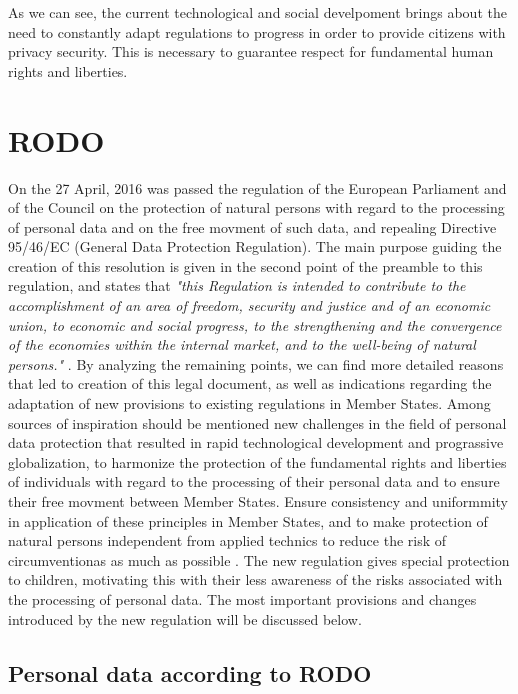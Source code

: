 \documentclass[en, noamssymb]{mgr}
\begin{document}
\indent As we can see, the current technological and social develpoment brings about the need to constantly adapt regulations to progress in order to provide citizens with privacy security. This is necessary to guarantee respect for fundamental human rights and liberties.

\chapter{RODO} \label{sec:sekcjaRODO}

On the 27 April, 2016 was passed the regulation of the European Parliament and of the Council on the protection of natural persons with regard to the processing of personal data and on the free movment of such data, and repealing Directive 95/46/EC (General Data Protection Regulation). The main purpose guiding the creation of this resolution is given in the second point of the preamble to this regulation, and states that \textit{"this Regulation is intended to contribute to the accomplishment of an area of
freedom, security and justice and of an economic union, to economic and social progress,
to the strengthening and the convergence of the economies within the internal market, and to the well-being of natural persons."} \cite{rodo_preambula}. By analyzing the remaining points, we can find more detailed reasons that led to creation of this legal document, as well as indications regarding the adaptation of new provisions to existing regulations in Member States. Among sources of inspiration should be mentioned new challenges in the field of personal data protection that resulted in rapid technological development and prograssive globalization, to harmonize the protection of the fundamental rights and liberties of individuals with regard to the processing of their personal data and to ensure their free movment between Member States. Ensure consistency and uniformmity in application of these principles in Member States, and to make protection of natural persons independent from applied technics to reduce the risk of circumventionas as much as possible \cite{rodo_preambula}. The new regulation gives special protection to children, motivating this with their less awareness of the risks associated with the processing of personal data. The most important provisions and changes introduced by the new regulation will be discussed below.

\section{Personal data according to RODO}
\end{document}
